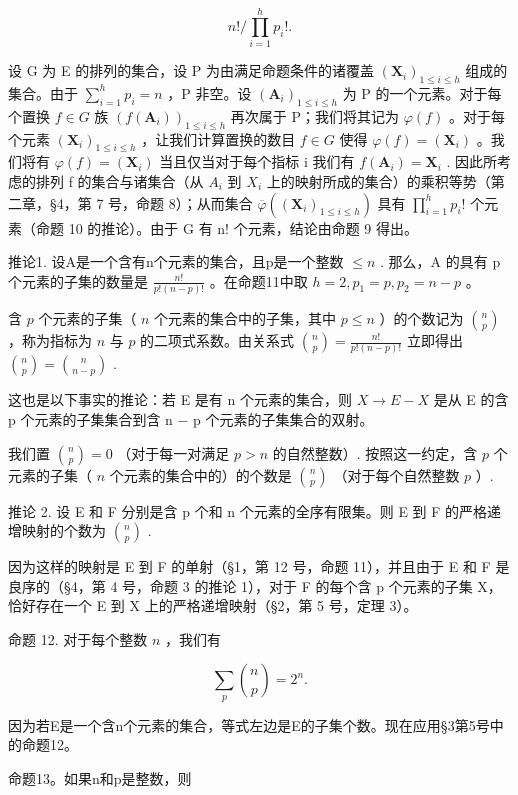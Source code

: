 \[
n! / \prod_ {i = 1} ^ {h} p _ {i}!.
\]

设 G 为 E 的排列的集合，设 P 为由满足命题条件的诸覆盖 \((\mathbf{X}_{i})_{1\leqslant i\leqslant h}\) 组成的集合。由于 \(\sum_{i=1}^{h}p_{i}=n\) ，P 非空。设 \((\mathbf{A}_{i})_{1\leqslant i\leqslant h}\) 为 P 的一个元素。对于每个置换 \(f\in G\) 族 \((f(\mathbf{A}_{i}))_{1\leqslant i\leqslant h}\) 再次属于 P；我们将其记为 \(\varphi(f)\) 。对于每个元素 \((\mathbf{X}_{i})_{1\leqslant i\leqslant h}\) ，让我们计算置换的数目 \(f\in G\) 使得 \(\varphi(f)=(\mathbf{X}_{i})\) 。我们将有 \(\varphi(f)=(\mathbf{X}_{i})\) 当且仅当对于每个指标 i 我们有 \(f(\mathbf{A}_{i})=\mathbf{X}_{i}\) . 因此所考虑的排列 f 的集合与诸集合（从 \(A_{i}\) 到 \(X_{i}\) 上的映射所成的集合）的乘积等势（第二章，§4，第 7 号，命题 8）；从而集合 \(\overline{\varphi}((\mathbf{X}_{i})_{1\leqslant i\leqslant h})\) 具有 \(\prod_{i=1}^{h}p_{i}!\) 个元素（命题 10 的推论）。由于 G 有 n! 个元素，结论由命题 9 得出。

推论1. 设A是一个含有n个元素的集合，且p是一个整数 \(\leqslant n\) . 那么，A 的具有 p 个元素的子集的数量是 \(\frac{n!}{p!(n-p)!}\) 。在命题11中取 \(h=2, p_{1}=p, p_{2}=n-p\) 。

含 \(p\) 个元素的子集（ \(n\) 个元素的集合中的子集，其中 \(p \leqslant n\) ）的个数记为 \(\binom{n}{p}\) ，称为指标为 \(n\) 与 \(p\) 的二项式系数。由关系式 \(\binom{n}{p} = \frac{n!}{p!(n - p)!}\) 立即得出 \(\binom{n}{p} = \binom{n}{n - p}\) .

这也是以下事实的推论：若 E 是有 n 个元素的集合，则 \(X \rightarrow E - X\) 是从 E 的含 p 个元素的子集集合到含 n − p 个元素的子集集合的双射。

我们置 \(\binom{n}{p} = 0\) （对于每一对满足 \(p > n\) 的自然整数）. 按照这一约定，含 \(p\) 个元素的子集（ \(n\) 个元素的集合中的）的个数是 \(\binom{n}{p}\) （对于每个自然整数 \(p\) ）.

推论 2. 设 E 和 F 分别是含 p 个和 n 个元素的全序有限集。则 E 到 F 的严格递增映射的个数为 \(\binom{n}{p}\) .

因为这样的映射是 E 到 F 的单射（§1，第 12 号，命题 11），并且由于 E 和 F 是良序的（§4，第 4 号，命题 3 的推论 1），对于 F 的每个含 p 个元素的子集 X，恰好存在一个 E 到 X 上的严格递增映射（§2，第 5 号，定理 3）。

命题 12. 对于每个整数 \(n\) ，我们有

\[
\sum_ {p} \binom{n}{p} = 2 ^ {n}.
\]

因为若E是一个含n个元素的集合，等式左边是E的子集个数。现在应用§3第5号中的命题12。

命题13。如果n和p是整数，则

